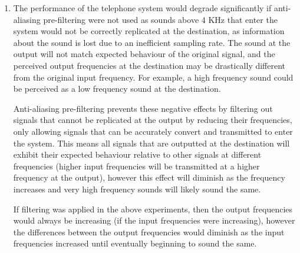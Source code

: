 \documentclass[12pt]{article}
\begin{document}
\begin{enumerate}
    \item
    The performance of the telephone system would degrade significantly if anti-aliasing pre-filtering were not used as sounds above 4 KHz that enter the system would not be correctly replicated at the destination, as information about the sound is lost due to an inefficient sampling rate. The sound at the output will not match expected behaviour of the original signal, and the perceived output frequencies at the destination may be drastically different from the original input frequency. For example, a high frequency sound could be perceived as a low frequency sound at the destination.
    
    Anti-aliasing pre-filtering prevents these negative effects by filtering out signals that cannot be replicated at the output by reducing their frequencies, only allowing signals that can be accurately convert and transmitted to enter the system. This means all signals that are outputted at the destination will exhibit their expected behaviour relative to other signals at different frequencies (higher input frequencies will be transmitted at a higher frequency at the output), however this effect will diminish as the frequency increases and very high frequency sounds will likely sound the same.

    If filtering was applied in the above experiments, then the output frequencies would always be increasing (if the input frequencies were increasing), however the differences between the output frequencies would diminish as the input frequencies increased until eventually beginning to sound the same.
\end{enumerate}

\clearpage
\end{document}
